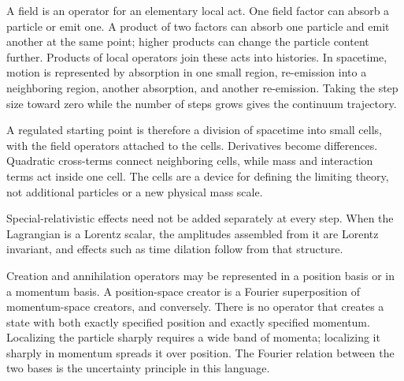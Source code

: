 A field is an operator for an elementary local act. One field factor can absorb a particle or emit one. A product of two factors can absorb one particle and emit another at the same point; higher products can change the particle content further. Products of local operators join these acts into histories. In spacetime, motion is represented by absorption in one small region, re-emission into a neighboring region, another absorption, and another re-emission. Taking the step size toward zero while the number of steps grows gives the continuum trajectory.

\begin{classroomqa}
\end{classroomqa}

A regulated starting point is therefore a division of spacetime into small cells, with the field operators attached to the cells. Derivatives become differences. Quadratic cross-terms connect neighboring cells, while mass and interaction terms act inside one cell. The cells are a device for defining the limiting theory, not additional particles or a new physical mass scale.

Special-relativistic effects need not be added separately at every step. When the Lagrangian is a Lorentz scalar, the amplitudes assembled from it are Lorentz invariant, and effects such as time dilation follow from that structure.

\begin{classroomqa}
\end{classroomqa}

Creation and annihilation operators may be represented in a position basis or in a momentum basis. A position-space creator is a Fourier superposition of momentum-space creators, and conversely. There is no operator that creates a state with both exactly specified position and exactly specified momentum. Localizing the particle sharply requires a wide band of momenta; localizing it sharply in momentum spreads it over position. The Fourier relation between the two bases is the uncertainty principle in this language.

